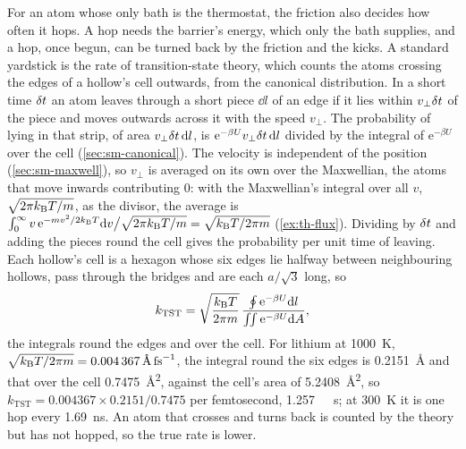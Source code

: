 For an atom whose only bath is the thermostat, the friction also decides
how often it hops. A hop needs the barrier's energy, which only the bath
supplies, and a hop, once begun, can be turned back by the friction and
the kicks. A standard yardstick is the rate of transition-state theory,
which counts the atoms crossing the edges of a hollow's cell outwards,
from the canonical distribution\cite{Eyring1935}. In a short time $\delta t$
an atom leaves through a short piece $\dd l$ of an edge if it lies within
$v_\perp\delta t$ of the piece and moves outwards across it with the speed
$v_\perp$. The probability of lying in that strip, of area $v_\perp\delta t\,
\mathrm{d} l$, is $\mathrm{e}^{-\beta U}v_\perp\delta t\,\mathrm{d} l$ divided by the
integral of $\mathrm{e}^{-\beta U}$ over the cell (\cref{sec:sm-canonical}).
The velocity is independent of the position (\cref{sec:sm-maxwell}), so
$v_\perp$ is averaged on its own over the Maxwellian, the atoms that move
inwards contributing 0: with the Maxwellian's integral over all $v$,
$\sqrt{2\pi k_{\mathrm{B}} T/m}$, as the divisor, the average is
$\int_0^\infty v\,\mathrm{e}^{-mv^2/2k_{\mathrm{B}} T}\mathrm{d} v\big/\sqrt{2\pi k_{\mathrm{B}} T/m} =
\sqrt{k_{\mathrm{B}} T/2\pi m}$ (\cref{ex:th-flux}). Dividing by $\delta t$ and adding the
pieces round the cell gives the probability per unit time of leaving.
Each hollow's cell is a hexagon whose six edges lie halfway between
neighbouring hollows, pass through the bridges and are each $a/\sqrt3$
long, so
\begin{equation}
   k_{\mathrm{TST}} = \sqrt{\frac{k_{\mathrm{B}} T}{2\pi m}}\,
   \frac{\oint\mathrm{e}^{-\beta U}\mathrm{d} l}{\iint\mathrm{e}^{-\beta U}\mathrm{d} A} ,
   \label{eq:th-tst}
\end{equation}
the integrals round the edges and over the cell. For lithium at
\SI{1000}{\kelvin}, $\sqrt{\kB T/2\pi m} =
\SI{0.004367}{\angstrom\per\femto\second}$, the integral round the six
edges is \SI{0.2151}{\angstrom} and that over the cell
\SI{0.7475}{\angstrom\squared}, against the cell's area of
\SI{5.2408}{\angstrom\squared}, so $k_{\mathrm{TST}} =
0.004367\times0.2151/0.7475$ per femtosecond, \SI{1.257}{\per\pico
\second}; at \SI{300}{\kelvin} it is one hop every
\SI{1.69}{\nano\second}. An atom that crosses and turns back is counted
by the theory but has not hopped, so the true rate is lower.

